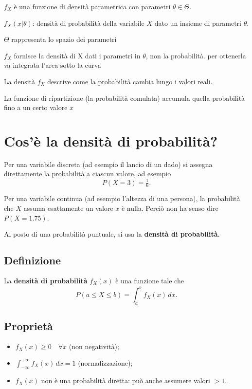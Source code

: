 \documentclass[a4paper,12pt]{article}
\begin{document}
	$f_X$ è una funzione di densità parametrica con parametri $\theta \in \Theta$.
	
$f_X(x|\theta)$: densità di probabilità della variabile $X$ dato un insieme di parametri $\theta$. 

$\Theta$ rappresenta lo spazio dei parametri 


$f_X$ fornisce la densità di X dati i parametri in $\theta$, non la probabilità. per ottenerla va integrata l'area sotto la curva



La densità $f_X$ descrive come la probabilità cambia lungo i valori reali. 

La funzione di ripartizione (la probabilità comulata) accumula quella probabilità fino a un certo valore $x$ 


\section*{Cos'è la densità di probabilità?}
	
	Per una variabile discreta (ad esempio il lancio di un dado) si assegna
	direttamente la probabilità a ciascun valore, ad esempio
	\[
	P(X=3) = \tfrac{1}{6}.
	\]
	
	Per una variabile continua (ad esempio l'altezza di una persona), la probabilità
	che $X$ assuma esattamente un valore $x$ è nulla. 
	Perciò non ha senso dire $P(X=1.75)$.
	
	Al posto di una probabilità puntuale, si usa la \textbf{densità di probabilità}.
	
	\subsection*{Definizione}
	La \textbf{densità di probabilità} $f_X(x)$ è una funzione tale che
	\[
	P(a \leq X \leq b) = \int_a^b f_X(x)\,dx.
	\]
	
	\subsection*{Proprietà}
	\begin{itemize}
		\item $f_X(x) \geq 0 \quad \forall x$ (non negatività);
		\item $\int_{-\infty}^{+\infty} f_X(x)\,dx = 1$ (normalizzazione);
		\item $f_X(x)$ non è una probabilità diretta: può anche assumere valori $>1$.
	\end{itemize}
	
\end{document}
